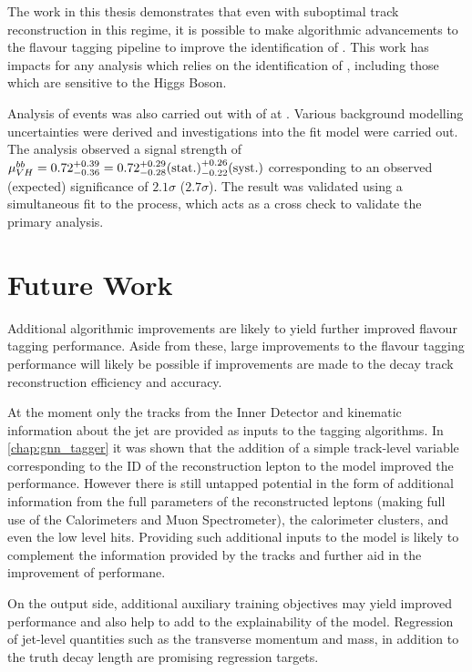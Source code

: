 The work in this thesis demonstrates that even with suboptimal track reconstruction in this regime, it is possible to make algorithmic advancements to the flavour tagging pipeline to improve the identification of \bjets.
This work has impacts for any analysis which relies on the identification of \bjets, including those which are sensitive to the Higgs Boson.

Analysis of \VHbb events was also carried out with \intlumi of \runtwo \ATLAS at .
Various background modelling uncertainties were derived and investigations into the fit model were carried out.
The analysis observed a signal strength of 
$\mu_{VH}^{bb} = 0.72 ^{+0.39}_{-0.36} = 0.72 ^{+0.29}_{-0.28} \mathrm{(stat.)} ^{+0.26}_{-0.22} \mathrm{(syst.)}$
corresponding to an observed (expected) significance of $2.1\sigma$ ($2.7\sigma$).
The result was validated using a simultaneous fit to the \VZbb process, which acts as a cross check to validate the primary analysis.



\section{Future Work}\label{sec:conc-future}

Additional algorithmic improvements are likely to yield further improved flavour tagging performance.
Aside from these, large improvements to the flavour tagging performance will likely be possible if improvements are made to the \bhadron decay track reconstruction efficiency and accuracy.

At the moment only the tracks from the Inner Detector and kinematic information about the jet are provided as inputs to the tagging algorithms.
In \cref{chap:gnn_tagger} it was shown that the addition of a simple track-level variable corresponding to the ID of the reconstruction lepton to the model improved the performance.
However there is still untapped potential in the form of additional information from the full parameters of the reconstructed leptons (making full use of the Calorimeters and Muon Spectrometer), the calorimeter clusters, and even the low level hits.
Providing such additional inputs to the model is likely to complement the information provided by the tracks and further aid in the improvement of performane.

On the output side, additional auxiliary training objectives may yield improved performance and also help to add to the explainability of the model.
Regression of jet-level quantities such as the transverse momentum and mass, in addition to the truth \bhadron decay length are promising regression targets.

